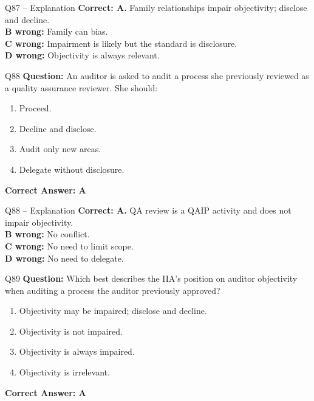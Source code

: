 \documentclass[aspectratio=169,10pt]{beamer}
\begin{document}
	\begin{frame}[t]{Q87 -- Explanation}
		\small
		\textbf{Correct: A.} Family relationships impair objectivity; disclose and decline. \\[4pt]
		\textbf{B wrong:} Family can bias. \\[2pt]
		\textbf{C wrong:} Impairment is likely but the standard is disclosure. \\[2pt]
		\textbf{D wrong:} Objectivity is always relevant.
	\end{frame}
	
	\begin{frame}[t]{Q88}
		\small
		\textbf{Question:} An auditor is asked to audit a process she previously reviewed as a quality assurance reviewer. She should:
		\begin{enumerate}[label=\Alph*.,itemsep=1pt,topsep=2pt]
			\item Proceed.
			\item Decline and disclose.
			\item Audit only new areas.
			\item Delegate without disclosure.
		\end{enumerate}
		\vspace{4pt}
		\textbf{Correct Answer: A}
	\end{frame}
	
	\begin{frame}[t]{Q88 -- Explanation}
		\small
		\textbf{Correct: A.} QA review is a QAIP activity and does not impair objectivity. \\[4pt]
		\textbf{B wrong:} No conflict. \\[2pt]
		\textbf{C wrong:} No need to limit scope. \\[2pt]
		\textbf{D wrong:} No need to delegate.
	\end{frame}
	
	\begin{frame}[t]{Q89}
		\small
		\textbf{Question:} Which best describes the IIA's position on auditor objectivity when auditing a process the auditor previously approved?
		\begin{enumerate}[label=\Alph*.,itemsep=1pt,topsep=2pt]
			\item Objectivity may be impaired; disclose and decline.
			\item Objectivity is not impaired.
			\item Objectivity is always impaired.
			\item Objectivity is irrelevant.
		\end{enumerate}
		\vspace{4pt}
		\textbf{Correct Answer: A}
	\end{frame}
	
\end{document}
